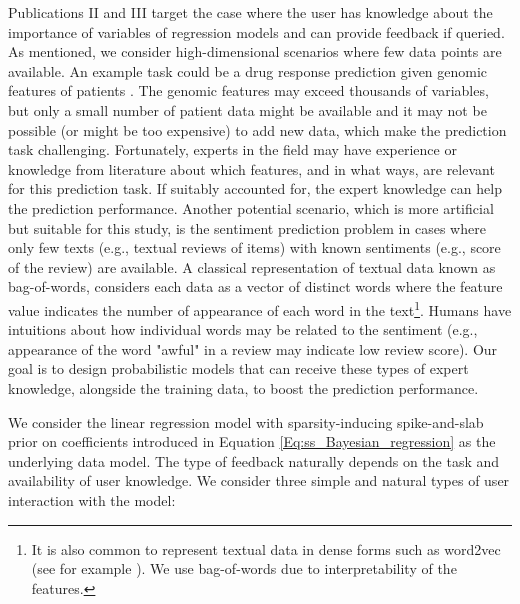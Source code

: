 \documentclass[dissertation,math,vertlayout,pdfa,colorlinks]{aaltoseries}
\begin{document}
Publications II and III target the case where the user has knowledge about the importance of variables of regression models and can provide feedback if queried. As mentioned, we consider high-dimensional scenarios where few data points are available. An example task could be a drug response prediction given genomic features of patients \cite{drug_response_prediction}. The genomic features may exceed thousands of variables, but only a small number of patient data might be available and it may not be possible (or might be too expensive) to add new data, which make the prediction task challenging. Fortunately, experts in the field may have experience or knowledge from literature about which features, and in what ways, are relevant for this prediction task. If suitably accounted for, the expert knowledge can help the prediction performance. Another potential scenario, which is more artificial but suitable for this study, is the sentiment prediction problem \cite{liu2015sentiment} in cases where only few texts (e.g., textual reviews of items) with known sentiments (e.g., score of the review) are available. A classical representation of textual data known as bag-of-words, considers each data as a vector of distinct words where the feature value indicates the number of appearance of each word in the text\footnote{It is also common to represent textual data in dense forms such as word2vec (see for example \cite{dai2015semi}). We use bag-of-words due to interpretability of the features.}. Humans have intuitions about how individual words may be related to the sentiment (e.g., appearance of the word "awful" in a review may indicate low review score). Our goal is to design probabilistic models that can receive these types of expert knowledge, alongside the training data, to boost the prediction performance.  

We consider the linear regression model with sparsity-inducing spike-and-slab prior on coefficients introduced in Equation \ref{Eq:ss_Bayesian_regression} as the underlying data model. The type of feedback naturally depends on the task and availability of user knowledge. We consider three simple and natural types of user interaction with the model: 
\end{document}
